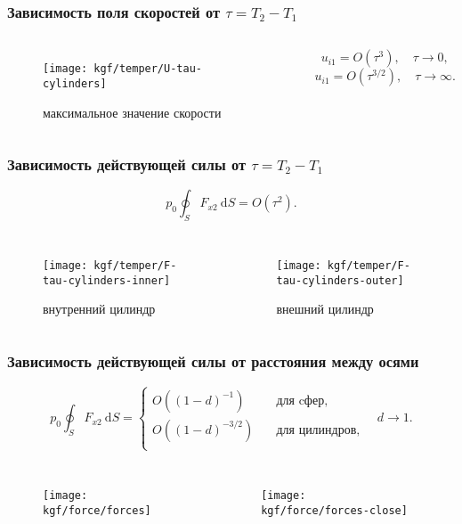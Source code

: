 \documentclass[mathserif]{beamer} %
\newcommand{\dd}{\:\mathrm{d}}
\newcommand{\OO}[1]{O(#1)}
\begin{document}
\begin{frame}
    \frametitle{Зависимость поля скоростей от \(\tau = T_2-T_1\)}
    \centering
    \begin{columns}
        \begin{figure}
            \texttt{[image: kgf/temper/U-tau-cylinders]}
            \vspace{-.5cm}\caption{максимальное значение скорости}
        \end{figure}
        \[ u_{i1} = \OO{\tau^3}, \quad \tau\to0, \]
        \[ u_{i1} = \OO{\tau^{3/2}}, \quad \tau\to\infty. \]
    \end{columns}
\end{frame}

\begin{frame}
    \frametitle{Зависимость действующей силы от \(\tau = T_2-T_1\)}
    \vspace{-.2cm}
    \[ p_0 \oint_S F_{x2}\dd{S} = \OO{\tau^2}. \]
    \vspace{-.7cm}
    \begin{columns}
        \begin{figure}
            \texttt{[image: kgf/temper/F-tau-cylinders-inner]}
            \vspace{-.5cm}\caption{внутренний цилиндр}
        \end{figure}
        \begin{figure}
            \texttt{[image: kgf/temper/F-tau-cylinders-outer]}
            \vspace{-.5cm}\caption{внешний цилиндр}
        \end{figure}
    \end{columns}
\end{frame}

\begin{frame}
    \frametitle{Зависимость действующей силы от расстояния между осями}
    \vspace{-.5cm}
    \[ p_0 \oint_S F_{x2}\dd{S} = \begin{cases}
        \OO{(1-d)^{-1}} & \quad\text{для cфер}, \\
        \OO{(1-d)^{-3/2}} & \quad\text{для цилиндров}, \\
        \end{cases} \quad d\to1. \]
    \vspace{-.7cm}
    \begin{columns}
        \begin{figure}
            \texttt{[image: kgf/force/forces]}
        \end{figure}
        \begin{figure}
            \texttt{[image: kgf/force/forces-close]}
        \end{figure}
    \end{columns}
\end{frame}
\end{document}
